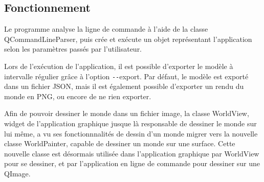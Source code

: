 \subsection{Fonctionnement}

Le programme analyse la ligne de commande à l'aide de la classe QCommandLineParser, puis crée et exécute un objet représentant l'application selon les paramètres passés par l'utilisateur.

Lors de l'exécution de l'application, il est possible d'exporter le modèle à intervalle régulier grâce à l'option \texttt{-{}-}export. Par défaut, le modèle est exporté dans un fichier JSON, mais il est également possible d'exporter un rendu du monde en PNG, ou encore de ne rien exporter.

Afin de pouvoir dessiner le monde dans un fichier image, la classe WorldView, widget de l'application graphique jusque là responsable de dessiner le monde sur lui même, a vu ses fonctionnnalités de dessin d'un monde migrer vers la nouvelle classe WorldPainter, capable de dessiner un monde sur une surface.
Cette nouvelle classe est désormais utilisée dans l'application graphique par WorldView pour se dessiner, et par l'application en ligne de commande pour dessiner sur une QImage.
